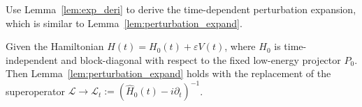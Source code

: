 
Use Lemma~\ref{lem:exp_deri} to derive the time-dependent perturbation expansion, which is similar to Lemma~\ref{lem:perturbation_expand}.

\begin{lemma}
\label{lem:td-perturbation-expand}
Given the Hamiltonian $H(t)=H_{0}(t)+\varepsilon V(t)$, where $H_0$ is time-independent and block-diagonal with respect to the fixed low-energy projector $P_0$. Then Lemma~\ref{lem:perturbation_expand} holds with the replacement of the superoperator
 $\mathcal L \to \mathcal L_t := (\hat H_0(t)-i\partial_t)^{-1}$.
\end{lemma}


